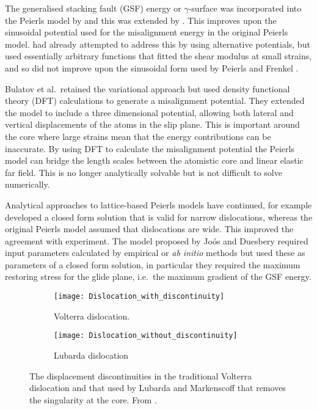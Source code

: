 


The generalised stacking fault (GSF) energy or $\gamma$-surface was incorporated into the Peierls model by \citet{Vitek1992} and this was extended by \citet{Bulatov1997}. This improves upon the sinusoidal potential used for the misalignment energy in the original Peierls model. \citet{Ohsawa1994} had already attempted to address this by using alternative potentials, but used essentially arbitrary functions that fitted the shear modulus at small strains,  and so did not improve upon the sinusoidal form used by Peierls and Frenkel \cite{Peierls1940,Frenkel1926}. 

Bulatov et al.\ retained the variational approach but used density functional theory (DFT) calculations to generate a misalignment potential. They extended the model to include a three dimensional potential, allowing both lateral and vertical displacements of the atoms in the slip plane. This is important around the core where large strains mean that the energy contributions can be inaccurate. By using DFT to calculate the misalignment potential the Peierls model can bridge the length scales between the atomistic core and linear elastic far field. This is no longer analytically solvable but is not difficult to solve numerically.

Analytical approaches to lattice-based Peierls models have continued, for example \citet{Joos1997} developed a closed form solution that is valid for narrow dislocations, whereas the original Peierls model assumed that dislocations are wide. This improved the agreement with experiment. The model proposed by Jo\'{o}s and Duesbery required input parameters calculated by empirical or \emph{ab initio} methods but used these as parameters of a closed form solution, in particular they required the maximum restoring stress for the glide plane, i.e.\ the maximum gradient of the GSF energy.

\begin{figure}
\centering
\begin{subfigure}{0.4\textwidth}
\centering
\texttt{[image: Dislocation\_with\_discontinuity]}
\caption{Volterra dislocation.\label{fig:disloc_discontinuity}}
\end{subfigure}%
\begin{subfigure}{0.4\textwidth}
\centering
\texttt{[image: Dislocation\_without\_discontinuity]}
\caption{Lubarda dislocation\label{fig:disloc_no_discontinuity}}
\end{subfigure}
\captionsetup{width=0.8\textwidth}
\caption[Volterra and Lubarda dislocations.]{The displacement discontinuities in the traditional Volterra dislocation and that used by Lubarda and Markenscoff that removes the singularity at the core. From \cite{Lubarda2007}.\label{fig:discontinuity}}
\end{figure}


